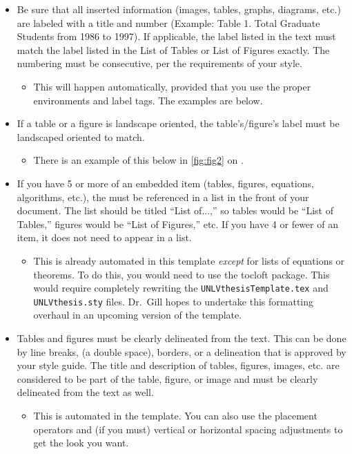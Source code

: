 \begin{itemize}
	\item Be sure that all inserted information (images, tables, graphs, diagrams, etc.) are labeled with a title and number (Example: Table 1. Total Graduate Students from 1986 to 1997). If applicable, the label listed in the text must match the label listed in the List of Tables or List of Figures exactly. The numbering must be consecutive, per the requirements of your style.
		\begin{itemize}
			\item This will happen automatically, provided that you use the proper environments and label tags. The examples are below. 
		\end{itemize}
	\item If a table or a figure is landscape oriented, the table's/figure's label must be landscaped oriented to match.
		\begin{itemize}
			\item There is an example of this below in \cref{fig:fig2} on . 
		\end{itemize}
	\item If you have 5 or more of an embedded item (tables, figures, equations, algorithms, etc.), the must be referenced in a list in the front of your document. The list should be titled ``List of...,'' so tables would be ``List of Tables,''  figures would be ``List of Figures,'' etc. If you have 4 or fewer of an item, it does not need to appear in a list. 
		\begin{itemize}
			\item This is already automated in this template \textit{except} for lists of equations or theorems. To do this, you would need to use the \textsf{tocloft} package. This would require completely rewriting the \texttt{UNLVthesisTemplate.tex} and \texttt{UNLVthesis.sty} files. Dr.\ Gill hopes to undertake this formatting overhaul in an upcoming version of the template.
		\end{itemize}	
	\item Tables and figures must be clearly delineated from the text. This can be done by line breaks, (a double space), borders, or a delineation that is approved by your style guide. The title and description of tables, figures, images, etc. are considered to be part of the table, figure, or image and must be clearly delineated from the text as well.
		\begin{itemize}
			\item This is automated in the template. You can also use the placement operators and (if you must) vertical or horizontal spacing adjustments to get the look you want. 

\end{itemize}
\end{itemize}
